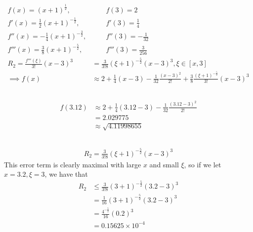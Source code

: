 \documentclass[11pt]{article}
\begin{document}
\section{} %
\subsection{} %
\begin{align*}
	f(x)=(x+1)^{\frac{1}{2}}, &\qquad f(3)=2\\
	f'(x)=\frac{1}{2}(x+1)^{-\frac{1}{2}}, &\qquad f'(3)=\frac{1}{4}\\
	f''(x)=-\frac{1}{4}(x+1)^{-\frac{3}{2}}, &\qquad f''(3)=-\frac{1}{32}\\
	f'''(x)=\frac{3}{8}(x+1)^{-\frac{5}{2}}, &\qquad f'''(3)=\frac{3}{256}\\
	R_2=\frac{f'''(\xi)}{3!}(x-3)^3&=\frac{3}{3!8}(\xi+1)^{-\frac{5}{2}}(x-3)^3,\xi\in[x,3]\\
	\implies f(x)&\approx2+\frac{1}{4}(x-3)-\frac{1}{32}\frac{(x-3)^2}{2!}+\frac{3}{8}\frac{(\xi+1)^{-\frac{5}{2}}}{3!}(x-3)^3
\end{align*}


\subsection{} %
\begin{align*}
	f(3.12)&\approx2+\frac{1}{4}(3.12-3)-\frac{1}{32}\frac{(3.12-3)^2}{2!}\\
	&=2.029775\\
	&\approx\sqrt{4.11998655}
\end{align*}


\subsection{} %
\begin{align*}
	R_2=\frac{3}{3!8}(\xi+1)^{-\frac{5}{2}}(x-3)^3
\end{align*}
This error term is clearly maximal with large $x$ and small $\xi$, so if we let
$x=3.2,\xi=3$, we have that
\begin{align*}
	R_2&\le\frac{3}{3!8}(3+1)^{-\frac{5}{2}}(3.2-3)^3\\
	&=\frac{1}{16}(3+1)^{-\frac{5}{2}}(3.2-3)^3\\
	&=\frac{4^{-\frac{5}{2}}}{16}(0.2)^3\\
	&=0.15625\times10^{-4}
\end{align*}
\end{document}
